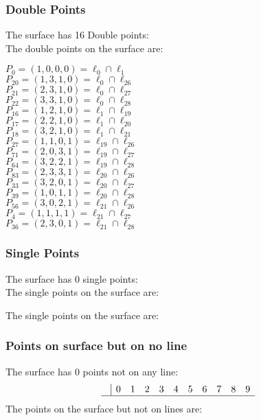 \documentclass{article}
\begin{document}
{\subsubsection*{Double Points}
The surface has 16 Double points:\\
The double points on the surface are:\\
\begin{multicols}{2}
\noindent
$P_{0} = ( 1, 0, 0, 0 ) = \ell_{0} \cap \ell_{1} $\\
$P_{20} = ( 1, 3, 1, 0 ) = \ell_{0} \cap \ell_{26} $\\
$P_{21} = ( 2, 3, 1, 0 ) = \ell_{0} \cap \ell_{27} $\\
$P_{22} = ( 3, 3, 1, 0 ) = \ell_{0} \cap \ell_{28} $\\
$P_{16} = ( 1, 2, 1, 0 ) = \ell_{1} \cap \ell_{19} $\\
$P_{17} = ( 2, 2, 1, 0 ) = \ell_{1} \cap \ell_{20} $\\
$P_{18} = ( 3, 2, 1, 0 ) = \ell_{1} \cap \ell_{21} $\\
$P_{27} = ( 1, 1, 0, 1 ) = \ell_{19} \cap \ell_{26} $\\
$P_{71} = ( 2, 0, 3, 1 ) = \ell_{19} \cap \ell_{27} $\\
$P_{64} = ( 3, 2, 2, 1 ) = \ell_{19} \cap \ell_{28} $\\
$P_{83} = ( 2, 3, 3, 1 ) = \ell_{20} \cap \ell_{26} $\\
$P_{33} = ( 3, 2, 0, 1 ) = \ell_{20} \cap \ell_{27} $\\
$P_{39} = ( 1, 0, 1, 1 ) = \ell_{20} \cap \ell_{28} $\\
$P_{56} = ( 3, 0, 2, 1 ) = \ell_{21} \cap \ell_{26} $\\
$P_{4} = ( 1, 1, 1, 1 ) = \ell_{21} \cap \ell_{27} $\\
$P_{36} = ( 2, 3, 0, 1 ) = \ell_{21} \cap \ell_{28} $\\
\end{multicols}
\subsubsection*{Single Points}
The surface has 0 single points:\\
The single points on the surface are:\\
\begin{multicols}{2}
\noindent
\end{multicols}
The single points on the surface are:\\
\subsubsection*{Points on surface but on no line}
The surface has 0 points not on any line:\\
$$
\begin{array}{r|*{10}{r}}
 & 0 & 1 & 2 & 3 & 4 & 5 & 6 & 7 & 8 & 9\\
\hline
\end{array}
$$
The points on the surface but not on lines are:\\
\begin{multicols}{2}
\noindent
\end{multicols}
}
\end{document}

